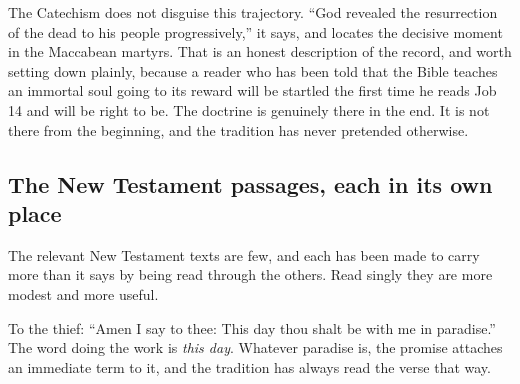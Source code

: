 The Catechism does not disguise this trajectory. ``God revealed the resurrection of the dead to his people progressively,'' it says, and locates the decisive moment in the Maccabean martyrs. That is an honest description of the record, and worth setting down plainly, because a reader who has been told that the Bible teaches an immortal soul going to its reward will be startled the first time he reads Job 14 and will be right to be. The doctrine is genuinely there in the end. It is not there from the beginning, and the tradition has never pretended otherwise.

\subsection{The New Testament passages, each in its own place}

The relevant New Testament texts are few, and each has been made to carry more than it says by being read through the others. Read singly they are more modest and more useful.

To the thief: ``Amen I say to thee: This day thou shalt be with me in paradise.'' The word doing the work is \emph{this day}. Whatever paradise is, the promise attaches an immediate term to it, and the tradition has always read the verse that way.

